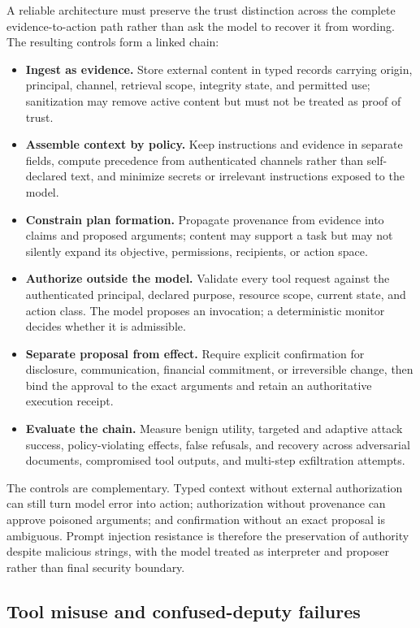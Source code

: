 A reliable architecture must preserve the trust distinction across the complete evidence-to-action path rather than ask the model to recover it from wording. The resulting controls form a linked chain:
\begin{itemize}
    \item \textbf{Ingest as evidence.} Store external content in typed records carrying origin, principal, channel, retrieval scope, integrity state, and permitted use; sanitization may remove active content but must not be treated as proof of trust.
    \item \textbf{Assemble context by policy.} Keep instructions and evidence in separate fields, compute precedence from authenticated channels rather than self-declared text, and minimize secrets or irrelevant instructions exposed to the model.
    \item \textbf{Constrain plan formation.} Propagate provenance from evidence into claims and proposed arguments; content may support a task but may not silently expand its objective, permissions, recipients, or action space.
    \item \textbf{Authorize outside the model.} Validate every tool request against the authenticated principal, declared purpose, resource scope, current state, and action class. The model proposes an invocation; a deterministic monitor decides whether it is admissible.
    \item \textbf{Separate proposal from effect.} Require explicit confirmation for disclosure, communication, financial commitment, or irreversible change, then bind the approval to the exact arguments and retain an authoritative execution receipt.
    \item \textbf{Evaluate the chain.} Measure benign utility, targeted and adaptive attack success, policy-violating effects, false refusals, and recovery across adversarial documents, compromised tool outputs, and multi-step exfiltration attempts.
\end{itemize}
The controls are complementary. Typed context without external authorization can still turn model error into action; authorization without provenance can approve poisoned arguments; and confirmation without an exact proposal is ambiguous. Prompt injection resistance is therefore the preservation of authority despite malicious strings, with the model treated as interpreter and proposer rather than final security boundary.

\subsection{Tool misuse and confused-deputy failures}


